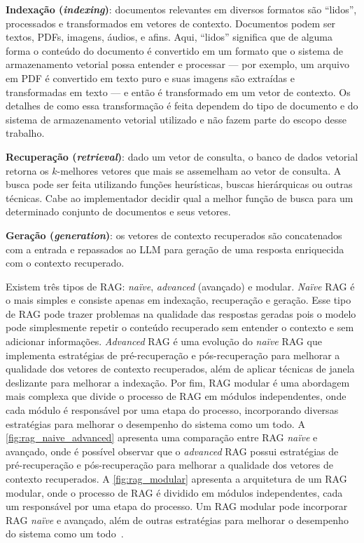 \documentclass[journal]{IEEEtran}
\begin{document}
\noindent\textbf{Indexação (\textit{indexing})}: documentos relevantes em diversos formatos são ``lidos'', processados e transformados em vetores de contexto.
Documentos podem ser textos, PDFs, imagens, áudios, e afins.
Aqui, ``lidos'' significa que de alguma forma o conteúdo do documento é convertido em um formato que o sistema de armazenamento vetorial possa entender e processar --- por exemplo, um arquivo em PDF é convertido em texto puro e suas imagens são extraídas e transformadas em texto --- e então é transformado em um vetor de contexto.
Os detalhes de como essa transformação é feita dependem do tipo de documento e do sistema de armazenamento vetorial utilizado e não fazem parte do escopo desse trabalho.

\noindent\textbf{Recuperação (\textit{retrieval})}: dado um vetor de consulta, o banco de dados vetorial retorna os $k$-melhores vetores que mais se assemelham ao vetor de consulta.
A busca pode ser feita utilizando funções heurísticas, buscas hierárquicas ou outras técnicas.
Cabe ao implementador decidir qual a melhor função de busca para um determinado conjunto de documentos e seus vetores.

\noindent\textbf{Geração (\textit{generation})}: os vetores de contexto recuperados são concatenados com a entrada e repassados ao LLM para geração de uma resposta enriquecida com o contexto recuperado.

Existem três tipos de RAG\@: \textit{naïve}, \textit{advanced} (avançado) e modular.
\textit{Naïve} RAG é o mais simples e consiste apenas em indexação, recuperação e geração.
Esse tipo de RAG pode trazer problemas na qualidade das respostas geradas pois o modelo pode simplesmente repetir o conteúdo recuperado sem entender o contexto e sem adicionar informações.
\textit{Advanced} RAG é uma evolução do \textit{naïve} RAG que implementa estratégias de pré-recuperação e pós-recuperação para melhorar a qualidade dos vetores de contexto recuperados, além de aplicar técnicas de janela deslizante para melhorar a indexação.
Por fim, RAG modular é uma abordagem mais complexa que divide o processo de RAG em módulos independentes, onde cada módulo é responsável por uma etapa do processo, incorporando diversas estratégias para melhorar o desempenho do sistema como um todo.
A \cref{fig:rag_naive_advanced} apresenta uma comparação entre RAG \textit{naïve} e avançado, 
onde é possível observar que o \textit{advanced} RAG possui estratégias de pré-recuperação e pós-recuperação para melhorar a qualidade dos vetores de contexto recuperados.
A \cref{fig:rag_modular} apresenta a arquitetura de um RAG modular, onde o processo de RAG é dividido em módulos independentes, cada um responsável por uma etapa do processo.
Um RAG modular pode incorporar RAG \textit{naïve} e avançado, além de outras estratégias para melhorar o desempenho do sistema como um todo~\cite{lewis2020retrieval,gao2023retrieval}.
\end{document}
